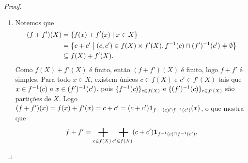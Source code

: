 \begin{proof}
\begin{enumerate}
	\item Notemos que
	\begin{align*}
	(f+f')(X) &= \set{f(x)+f'(x)}{x \in X} \\
		&= \set{c+c'}{(c,c') \in f(X) \times f'(X), f\inv(c) \cap (f')\inv(c') \neq \emptyset} \\
		&\subseteq f(X)+f'(X).
	\end{align*}
Como $f(X)+f'(X)$ é finito, então $(f+f')(X)$ é finito, logo $f+f'$ é simples. %
Para todo $x \in X$, existem únicos $c \in f(X)$ e $c' \in f'(X)$ tais que $x \in f^{-1}(c)$ e $x \in (f')^{-1}(c')$, pois $\{f^{-1}(c)\}_{c \in f(X)}$ e $\{(f')^{-1}(c)\}_{c \in f'(X)}$ são partições de $X$. Logo $(f+f')(x) = f(x)+f'(x) = c+c' = (c+c') {\bm 1}_{f^{-1}(c) \cap f^{-1}(c')}(x)$, o que mostra que
	\begin{equation*}
	f+f' = \sum_{c \in f(X)} \sum_{c' \in f(X)} (c + c') \idc_{f\inv(c) \cap f\inv(c')},

\end{equation*}
\end{enumerate}
\end{proof}
